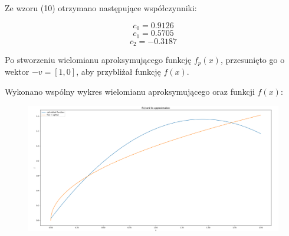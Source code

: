 \documentclass{article}
\begin{document}
	Ze wzoru (10) otrzymano następujące współczynniki:
	
	$$c_0 = 0.9126$$
	$$c_1 = 0.5705$$
	$$c_2 = -0.3187$$
	
	Po stworzeniu wielomianu aproksymującego funkcję $f_p(x)$, przesunięto go o wektor $-v = [1, 0]$, aby przybliżał funkcję $f(x)$. 
	
	
	Wykonano wspólny wykres wielomianu aproksymującego oraz funkcji $f(x)$:
	
	
	\begin{figure}[h]
    		\centering
  		\includegraphics[scale = 0.3]{wykres2.png}
	\end{figure}
	
	
	
	
	
	
	
	
	
	
	
	
	
	
	
	
	
	
	
	
	
	
	
	
	
	
	
	
	
	
	
\end{document}
